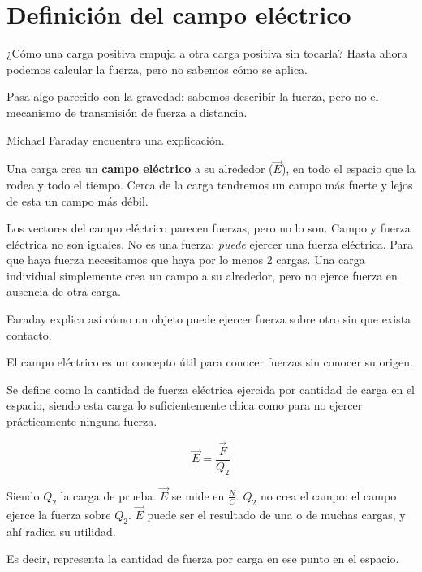 \section{Definición del campo eléctrico}

¿Cómo una carga positiva empuja a otra carga positiva sin tocarla?
Hasta ahora podemos calcular la fuerza,
pero no sabemos cómo se aplica.

Pasa algo parecido con la gravedad:
sabemos describir la fuerza,
pero no el mecanismo de transmisión de fuerza a distancia.

Michael Faraday encuentra una explicación.

Una carga crea un \textbf{campo eléctrico} a su alrededor (\(\vec{E}\)),
en todo el espacio que la rodea y todo el tiempo.
Cerca de la carga tendremos un campo más fuerte
y lejos de esta un campo más débil.

Los vectores del campo eléctrico parecen fuerzas,
pero no lo son.
Campo y fuerza eléctrica no son iguales.
No es una fuerza: \textit{puede} ejercer una fuerza eléctrica.
Para que haya fuerza necesitamos que haya por lo menos 2 cargas.
Una carga individual simplemente crea un campo a su alrededor,
pero no ejerce fuerza en ausencia de otra carga.

Faraday explica así cómo un objeto puede ejercer fuerza sobre otro sin que exista contacto.

El campo eléctrico es un concepto útil para conocer fuerzas sin conocer su origen.

Se define como la cantidad de fuerza eléctrica ejercida por cantidad de carga en el espacio,
siendo esta carga lo suficientemente chica como para no ejercer prácticamente ninguna fuerza.

\vspace{.3cm}
\begin{equation}
    \vec{E} = \frac{\vec{F}}{Q_2}
\end{equation}

Siendo \(Q_2\) la carga de prueba. \(\vec{E}\) se mide en \(\frac{N}{C}\).
\(Q_2\) no crea el campo: el campo ejerce la fuerza sobre \(Q_2\).
\(\vec{E}\) puede ser el resultado de una o de muchas cargas,
y ahí radica su utilidad.

Es decir, representa la cantidad de fuerza por carga en ese punto en el espacio.